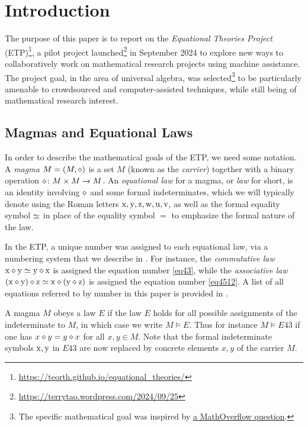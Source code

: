 \section{Introduction}

The purpose of this paper is to report on the \emph{Equational Theories Project} (ETP)\footnote{\url{https://teorth.github.io/equational_theories/}}, a pilot project launched\footnote{\url{https://terrytao.wordpress.com/2024/09/25}} in September 2024 to explore new ways to collaboratively work on mathematical research projects using machine assistance. The project goal, in the area of universal algebra, was selected\footnote{The specific mathematical goal was inspired by \href{https://mathoverflow.net/questions/450930}{a MathOverflow question}.} to be particularly amenable to crowdsourced and computer-assisted techniques, while still being of mathematical research interest. 

\subsection{Magmas and Equational Laws}

In order to describe the mathematical goals of the ETP, we need some notation. A \emph{magma} $M = (M,\diamond)$ is a set $M$ (known as the \emph{carrier}) together with a binary operation $\diamond \colon M \times M \to M$. An \emph{equational law} for a magma, or \emph{law} for short, is an identity involving $\diamond$ and some formal indeterminates, which we will typically denote using the Roman letters $\mathrm{x},\mathrm{y},\mathrm{z},\mathrm{w},\mathrm{u},\mathrm{v}$, as well as the formal equality symbol $\simeq$ in place of the equality symbol $=$ to emphasize the formal nature of the law.

In the ETP, a unique number was assigned to each equational law, via a numbering system that we describe in .  For instance, the \emph{commutative law} $\mathrm{x} \diamond \mathrm{y} \simeq \mathrm{y} \diamond \mathrm{x}$ is assigned the equation number \eqref{eq43}, while the \emph{associative law} $(\mathrm{x} \diamond \mathrm{y}) \diamond \mathrm{z} \simeq \mathrm{x} \diamond (\mathrm{y} \diamond \mathrm{z})$ is assigned the equation number \eqref{eq4512}.  A list of all equations referred to by number in this paper is provided in .

A magma $M$ obeys a law $E$ if the law $E$ holds for all possible assignments of the indeterminate to $M$, in which case we write $M \models E$. Thus for instance $M \models E43$ if one has $x \diamond y = y \diamond x$ for all $x,y \in M$.  Note that the formal indeterminate symbols $\mathrm{x}, \mathrm{y}$ in $E43$ are now replaced by concrete elements $x,y$ of the carrier $M$.

